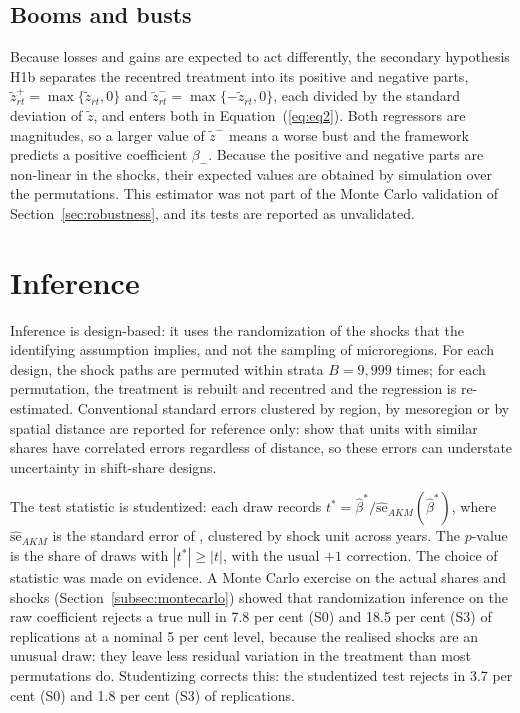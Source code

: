 \documentclass[
	11pt,				%
	oneside,			%
	a4paper,			%
	english,			%
	english				%
	]{abntex2ppgsi}
\theoremstyle{plain}
\theoremstyle{remark}
\theoremstyle{plain}%
\theoremstyle{remark}%
\begin{document}
\subsection{Booms and busts}
\label{sec:decomposition}

Because losses and gains are expected to act differently, the secondary hypothesis H1b separates the recentred treatment into its positive and negative parts, $\tilde{z}^{+}_{rt} = \max\{\tilde{z}_{rt}, 0\}$ and $\tilde{z}^{-}_{rt} = \max\{-\tilde{z}_{rt}, 0\}$, each divided by the standard deviation of $\tilde{z}$, and enters both in Equation~(\ref{eq:eq2}). Both regressors are magnitudes, so a larger value of $\tilde{z}^{-}$ means a worse bust and the framework predicts a positive coefficient $\beta_{-}$. Because the positive and negative parts are non-linear in the shocks, their expected values are obtained by simulation over the permutations. This estimator was not part of the Monte Carlo validation of Section~\ref{sec:robustness}, and its tests are reported as unvalidated.

\section{Inference}
\label{sec:inference}

Inference is design-based: it uses the randomization of the shocks that the identifying assumption implies, and not the sampling of microregions. For each design, the shock paths are permuted within strata $B = 9{,}999$ times; for each permutation, the treatment is rebuilt and recentred and the regression is re-estimated. Conventional standard errors clustered by region, by mesoregion or by spatial distance are reported for reference only:  show that units with similar shares have correlated errors regardless of distance, so these errors can understate uncertainty in shift-share designs.

The test statistic is studentized: each draw records $t^{*} = \hat\beta^{*}/\widehat{\mathrm{se}}_{AKM}(\hat\beta^{*})$, where $\widehat{\mathrm{se}}_{AKM}$ is the standard error of , clustered by shock unit across years. The $p$-value is the share of draws with $|t^{*}| \geq |t|$, with the usual $+1$ correction. The choice of statistic was made on evidence. A Monte Carlo exercise on the actual shares and shocks (Section~\ref{subsec:montecarlo}) showed that randomization inference on the raw coefficient rejects a true null in 7.8 per cent (S0) and 18.5 per cent (S3) of replications at a nominal 5 per cent level, because the realised shocks are an unusual draw: they leave less residual variation in the treatment than most permutations do. Studentizing corrects this: the studentized test rejects in 3.7 per cent (S0) and 1.8 per cent (S3) of replications.
\end{document}
